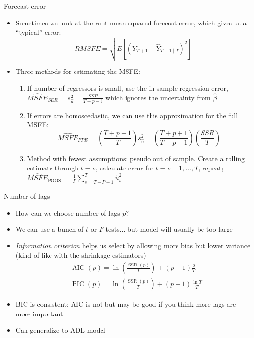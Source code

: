\documentclass[aspectratio=169]{beamer}
\begin{document}
\begin{frame}{Forecast error}
    \begin{itemize}
       \item Sometimes we look at the root mean squared forecast error, which gives us a ``typical'' error:
       $$
        RMSFE = \sqrt{E\left[\left(Y_{T+1}-\hat{Y}_{T+1 \mid T}\right)^2\right]}
       $$
       \item Three methods for estimating the MSFE:
       \begin{enumerate}
        \item If number of regressors is small, use the in-sample regression error, $\widehat{M S F E}_{S E R}=s_{\hat{u}}^2=\frac{S S R}{T-p-1}$ which ignores the uncertainty from $\hat{\beta}$ 
        \item If errors are homoscedastic, we can use this approximation for the full MSFE:
        $$
        \widehat{M S F E}_{F P E}=\left(\frac{T+p+1}{T}\right) s_{\hat{u}}^2=\left(\frac{T+p+1}{T-p-1}\right)\left(\frac{S S R}{T}\right)
        $$
        \item Method with fewest assumptions: pseudo out of sample. Create a rolling estimate through $t=s$, calculate error for $t=s+1,\dots,T$, repeat; $\widehat{M S F E}_{\text {POOS }}=\frac{1}{P} \sum_{s=T-P+1}^T \tilde{u}_s^2$
       \end{enumerate}
    \end{itemize}
\end{frame}

\begin{frame}{Number of lags}
    \begin{itemize}
       \item How can we choose number of lags $p$?
       \item We can use a bunch of $t$ or $F$ tests... but model will usually be too large
       \item \textit{Information criterion} helps us select by allowing more bias but lower variance (kind of like with the shrinkage estimators)
       $$
       \begin{aligned}
        & \operatorname{AIC}(p)=\ln \left(\frac{\operatorname{SSR}(p)}{T}\right)+(p+1) \frac{2}{T} \\
        & \operatorname{BIC}(p)=\ln \left(\frac{\operatorname{SSR}(p)}{T}\right)+(p+1) \frac{\ln T}{T}
        \end{aligned}
       $$
       \item BIC is consistent; AIC is not but may be good if you think more lags are more important
       \item Can generalize to ADL model
    \end{itemize}
\end{frame}
\end{document}
